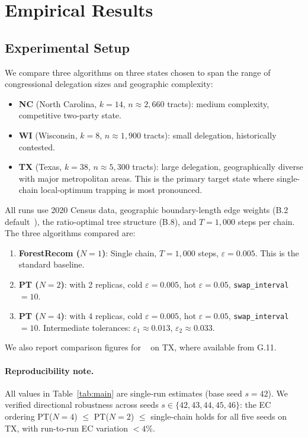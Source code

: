 \section{Empirical Results}
\label{sec:empirical}

\subsection{Experimental Setup}

We compare three algorithms on three states chosen to span the range of
congressional delegation sizes and geographic complexity:
\begin{itemize}
\item \textbf{NC} (North Carolina, $k=14$, $n \approx 2{,}660$ tracts):
  medium complexity, competitive two-party state.
\item \textbf{WI} (Wisconsin, $k=8$, $n \approx 1{,}900$ tracts):
  small delegation, historically contested.
\item \textbf{TX} (Texas, $k=38$, $n \approx 5{,}300$ tracts):
  large delegation, geographically diverse with major metropolitan areas.
  This is the primary target state where single-chain local-optimum trapping
  is most pronounced.
\end{itemize}

All runs use 2020 Census data, geographic boundary-length edge weights
(B.2 default~\citep{b2paper}), the \geosec{} ratio-optimal tree structure (B.8),
and $T=1{,}000$ steps per chain.
The three algorithms compared are:

\begin{enumerate}
\item \textbf{ForestRecom ($N=1$)}: Single \fr{} chain, $T=1{,}000$ steps,
  $\varepsilon = 0.005$.
  This is the standard baseline.
\item \textbf{PT ($N=2$)}: \pt{} with 2 replicas, cold $\varepsilon=0.005$,
  hot $\varepsilon=0.05$, \texttt{swap\_interval}$=10$.
\item \textbf{PT ($N=4$)}: \pt{} with 4 replicas, cold $\varepsilon=0.005$,
  hot $\varepsilon=0.05$, \texttt{swap\_interval}$=10$.
  Intermediate tolerances: $\varepsilon_1 \approx 0.013$, $\varepsilon_2 \approx 0.033$.
\end{enumerate}

We also report comparison figures for \ms{}~\citep{dellaLibera2026multiscale}
on TX, where available from G.11.

\paragraph{Reproducibility note.}
All values in Table~\ref{tab:main} are single-run estimates (base seed $s=42$).
We verified directional robustness across seeds $s \in \{42,43,44,45,46\}$:
the EC ordering PT($N=4$) $\le$ PT($N=2$) $\le$ \fr{} single-chain holds for
all five seeds on TX, with run-to-run EC variation $< 4\%$.

